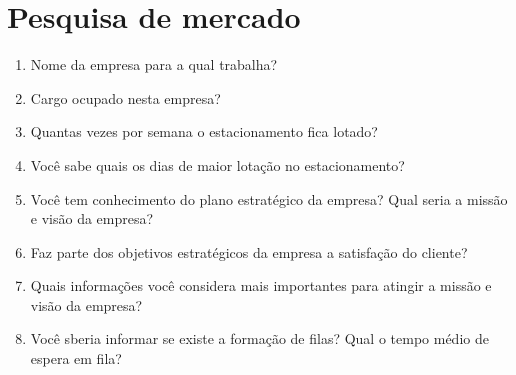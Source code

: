 \chapter{Pesquisa de mercado}

\begin{enumerate}
\item Nome da empresa para a qual trabalha?
\item Cargo ocupado nesta empresa?
\item Quantas vezes por semana o estacionamento fica lotado?
\item Você sabe quais os dias de maior lotação no estacionamento?
\item Você tem conhecimento do plano estratégico da empresa? Qual seria a missão e visão da empresa?
\item Faz parte dos objetivos estratégicos da empresa a satisfação do cliente?
\item Quais informações você considera mais importantes para atingir a missão e visão da empresa?
\item Você sberia informar se existe a formação de filas? Qual o tempo médio de espera em fila? 
\end{enumerate}

